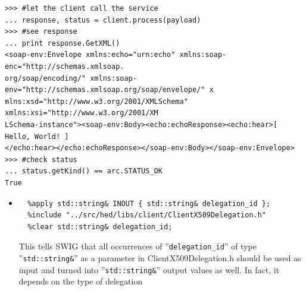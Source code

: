 \documentclass{article}
\begin{document}
\begin{flushleft}
\begin{itemize}
{\begin{example}
\begin{verbatim}
>>> #let the client call the service
... response, status = client.process(payload)
>>> #see response
... print response.GetXML()
<soap-env:Envelope xmlns:echo="urn:echo" xmlns:soap-enc="http://schemas.xmlsoap.
org/soap/encoding/" xmlns:soap-env="http://schemas.xmlsoap.org/soap/envelope/" x
mlns:xsd="http://www.w3.org/2001/XMLSchema" xmlns:xsi="http://www.w3.org/2001/XM
LSchema-instance"><soap-env:Body><echo:echoResponse><echo:hear>[ Hello, World! ]
</echo:hear></echo:echoResponse></soap-env:Body></soap-env:Envelope>
>>> #check status
... status.getKind() == arc.STATUS_OK
True
\end{verbatim}
    \end{example}
  
  }
\end{itemize}
\begin{itemize}
  \item{ \begin{verbatim}
  %apply std::string& INOUT { std::string& delegation_id };
  %include "../src/hed/libs/client/ClientX509Delegation.h"
  %clear std::string& delegation_id;
  \end{verbatim}
  This tells SWIG that all occurrences of ''\verb$delegation_id$'' of type ''\verb$std::string&$'' 
  as a parameter in ClientX509Delegation.h should be used as input and turned into 
  ''\verb$std::string&$'' output values as well. In fact, it depends on the type of delegation
}
\end{itemize}
\end{flushleft}
\end{document}
